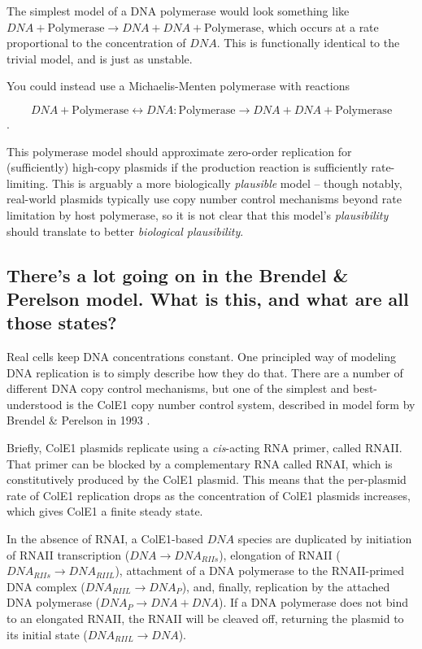 \documentclass[preprint,12pt]{oldplainarticle}
\begin{document}
The simplest model of a DNA polymerase would look something like $DNA + \text{Polymerase} \to DNA + DNA + \text{Polymerase}$, which occurs at a rate proportional to the concentration of $DNA$. This is functionally identical to the trivial model, and is just as unstable.

You could instead use a Michaelis-Menten polymerase with reactions

$$DNA + \text{Polymerase} \leftrightarrow DNA:\text{Polymerase} \to DNA + DNA + \text{Polymerase}$$.

This polymerase model should approximate zero-order replication for (sufficiently) high-copy plasmids if the production reaction is sufficiently rate-limiting. This is arguably a more biologically \emph{plausible} model -- though notably, real-world plasmids typically use copy number control mechanisms beyond rate limitation by host polymerase, so it is not clear that this model's \emph{plausibility} should translate to better \emph{biological plausibility}.

\subsection{There's a lot going on in the Brendel \& Perelson model. What is this, and what are all those states?}

Real cells keep DNA concentrations constant. One principled way of modeling DNA replication is to simply describe how they do that. There are a number of different DNA copy control mechanisms, but one of the simplest and best-understood is the ColE1 copy number control system, described in model form by Brendel \& Perelson in 1993 \cite{Brendel1993}. 

Briefly, ColE1 plasmids replicate using a \emph{cis}-acting RNA primer, called RNAII. That primer can be blocked by a complementary RNA called RNAI, which is constitutively produced by the ColE1 plasmid. This means that the per-plasmid rate of ColE1 replication drops as the concentration of ColE1 plasmids increases, which gives ColE1 a finite steady state. 

In the absence of RNAI, a ColE1-based $DNA$ species are duplicated by initiation of RNAII transcription ($DNA \to DNA_{RIIs}$), elongation of RNAII ($DNA_{RIIs} \to DNA_{RIIL}$), attachment of a DNA polymerase to the RNAII-primed DNA complex ($DNA_{RIIL} \to DNA_P$), and, finally, replication by the attached DNA polymerase ($DNA_P \to DNA + DNA$). If a DNA polymerase does not bind to an elongated RNAII, the RNAII will be cleaved off, returning the plasmid to its initial state ($DNA_{RIIL} \to DNA$). 
\end{document}
